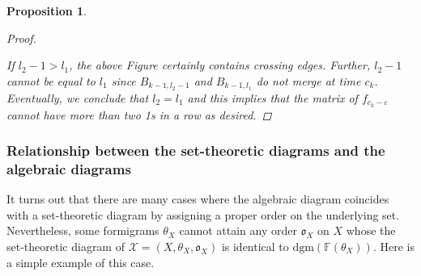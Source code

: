 \documentclass[a4paper,12pt]{article}
\newtheorem{proposition}{Proposition}[section]
\newcommand{\eps}{\varepsilon}
\newcommand{\dgm}{\mathrm{dgm}}
\begin{document}
\begin{proposition}
\begin{proof}
	\begin{center}
		\begin{figure}[h]
			\caption{}
		\end{figure}
	\end{center}
	If $l_2-1>l_1$, the above Figure certainly contains crossing edges. Further, $l_2-1$ cannot be equal to  $l_1$ since $B_{k-1,l_2-1}$ and $B_{k-1,l_1}$ do not merge at time $c_k$. Eventually, we conclude that $l_2=l_1$ and this implies that the matrix of $f_{{c_k}-\eps}$ cannot have more than two 1s in a row as desired.
\end{proof}
\end{proposition} 	

\subsubsection{Relationship between the set-theoretic diagrams and the algebraic diagrams}
It turns out that there are many cases where the algebraic diagram coincides with a set-theoretic diagram by assigning a proper order on the underlying set. Nevertheless, some formigrams $\theta_X$ cannot attain any order $\mathfrak{o}_X$ on $X$ whose the set-theoretic diagram of $\mathcal{X}=(X,\theta_X,\mathfrak{o}_X)$ is identical to $\dgm(\mathbb{F}(\theta_X))$. Here is a simple example of this case.
\end{document}
